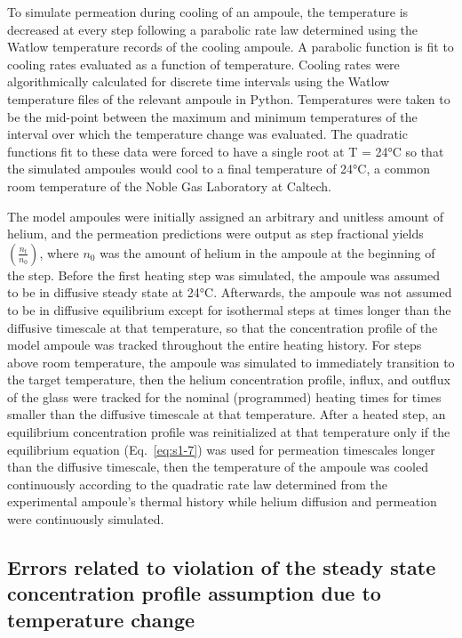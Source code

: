 To simulate permeation during cooling of an ampoule, the temperature is
decreased at every step following a parabolic rate law determined using
the Watlow temperature records of the cooling ampoule. A parabolic
function is fit to cooling rates evaluated as a function of temperature.
Cooling rates were algorithmically calculated for discrete time
intervals using the Watlow temperature files of the relevant ampoule
in Python. Temperatures were taken to be the mid-point between the
maximum and minimum temperatures of the interval over which the
temperature change was evaluated. The quadratic functions fit to these
data were forced to have a single root at T = 24°C so that the
simulated ampoules would cool to a final temperature of 24°C, a common
room temperature of the Noble Gas Laboratory at Caltech.

The model ampoules were initially assigned an arbitrary and unitless
amount of helium, and the permeation predictions were output as step
fractional yields \(\left( \frac{n_{t}}{n_{0}} \right)\), where
\(n_{0}\) was the amount of helium in the ampoule at the beginning of
the step. Before the first heating step was simulated, the ampoule was
assumed to be in diffusive steady state at 24°C. Afterwards, the ampoule
was not assumed to be in diffusive equilibrium except for isothermal
steps at times longer than the diffusive timescale at that temperature,
so that the concentration profile of the model ampoule was tracked
throughout the entire heating history. For steps above room temperature,
the ampoule was simulated to immediately transition to the target
temperature, then the helium concentration profile, influx, and outflux
of the glass were tracked for the nominal (programmed) heating times for
times smaller than the diffusive timescale at that temperature. After a
heated step, an equilibrium concentration profile was reinitialized at
that temperature only if the equilibrium equation (Eq.~\eqref{eq:s1-7}) was used
for permeation timescales longer than the diffusive timescale, then the
temperature of the ampoule was cooled continuously according to the
quadratic rate law determined from the experimental ampoule's thermal
history while helium diffusion and permeation were continuously
simulated.

\subsection{Errors related to violation of the steady state concentration
profile assumption due to temperature change}\label{errors-related-to-violation-of-the-steady-state-concentration-profile-assumption}

